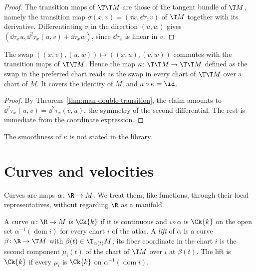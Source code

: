 \begin{proof}
  \leanok
  The transition maps of $\T\T M$ are those of the tangent bundle of $\T M$, namely the
  transition map $\sigma(x, v) = (\tau x, \dd\tau_x v)$ of $\T M$ together with its derivative.
  Differentiating $\sigma$ in the direction $(u, w)$ gives $(\dd\tau_x u, \dd^2\tau_x(u, v) +
  \dd\tau_x w)$, since $\dd\tau_x$ is linear in $v$.
\end{proof}

\begin{theorem}
  \label{thm:man-flip}
  \leanok
  The swap $((x, v), (u, w)) \mapsto ((x, u), (v, w))$ commutes with the transition maps of
  $\T\T M$. Hence the map $\kappa \colon \T\T M \to \T\T M$ defined as the swap in the preferred
  chart reads as the swap in every chart of $\T\T M$ over a chart of $M$. It covers the identity
  of $M$, and $\kappa \circ \kappa = \id$.
\end{theorem}

\begin{proof}
  \leanok
  By Theorem~\ref{thm:man-double-transition}, the claim amounts to $\dd^2\tau_x(u, v) =
  \dd^2\tau_x(v, u)$, the symmetry of the second differential. The rest is immediate from the
  coordinate expression.
\end{proof}

The smoothness of $\kappa$ is not stated in the library.

\section{Curves and velocities}

Curves are maps $\alpha \colon \R \to M$. We treat them, like functions, through their local
representatives, without regarding $\R$ as a manifold.

\begin{definition}
  \label{def:ck-curve}
  \leanok
  A curve $\alpha \colon \R \to M$ is $\Ck{k}$ if it is continuous and $i \circ \alpha$ is
  $\Ck{k}$ on the open set $\alpha^{-1}(\operatorname{dom} i)$ for every chart $i$ of the atlas. A
  \emph{lift} of $\alpha$ is a curve $\beta \colon \R \to \T M$ with $\beta(t) \in \T_{\alpha(t)}
  M$; its fiber coordinate in the chart $i$ is the second component $\mu_i(t)$ of the chart of
  $\T M$ over $i$ at $\beta(t)$. The lift is $\Ck{k}$ if every $\mu_i$ is $\Ck{k}$ on
  $\alpha^{-1}(\operatorname{dom} i)$.
\end{definition}

